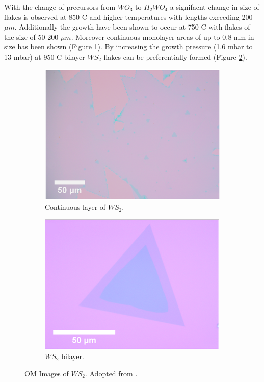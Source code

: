With the change of precursors from $WO_3$ to $H_2WO_4$ a signifacnt change in size of flakes is observed at 850 {\degree}C  and higher temperatures with lengths exceeding 200 $\mu m$. Additionally the growth have been shown to occur at 750 {\degree}C with flakes of the size of 50-200 $\mu m$. Moreover continuous monolayer areas of up to 0.8 mm in size has been shown (Figure \ref{fig:PaperSIOpticalContinous}). By increasing the growth pressure (1.6 mbar to 13 mbar) at 950 {\degree}C bilayer $WS_2$ flakes can be preferentially formed (Figure \ref{fig:PaperSIOpticalAFM}).

\begin{figure}[h]
	\begin{center}
		\begin{subfigure}[b]{0.45\textwidth}
			\includegraphics[scale=0.3]{PaperSIOpticalContinous.png}
			\caption{Continuous layer of $WS_2$.}
			\label{fig:PaperSIOpticalContinous}
		\end{subfigure}
		\qquad
		\begin{subfigure}[b]{0.45\textwidth}
			\includegraphics[scale=0.5]{PaperSIOpticalAFM.png}
			\caption{$WS_2$ bilayer.}
			\label{fig:PaperSIOpticalAFM}
		\end{subfigure}
		\caption{OM Images of $WS_2$. Adopted from \cite{Reale2017}.}
		\label{fig:PaperSIOpticalImages}
	\end{center}
\end{figure}

